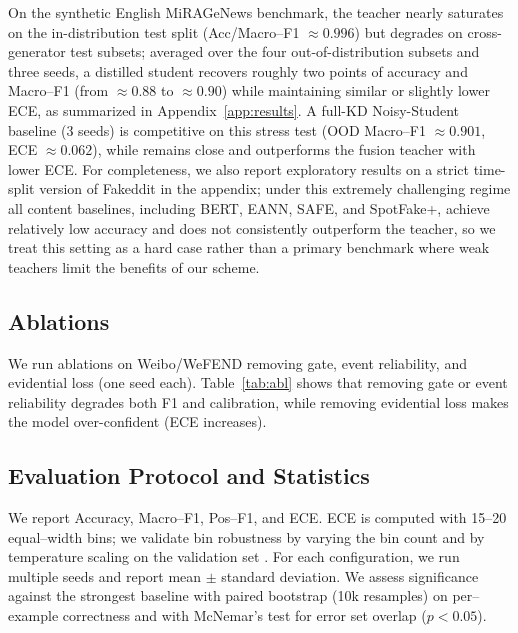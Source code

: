 On the synthetic English MiRAGeNews benchmark, the teacher nearly saturates on the in-distribution test split (Acc/Macro--F1 $\approx 0.996$) but degrades on cross-generator test subsets; averaged over the four out-of-distribution subsets and three seeds, a distilled student recovers roughly two points of accuracy and Macro--F1 (from $\approx 0.88$ to $\approx 0.90$) while maintaining similar or slightly lower ECE, as summarized in Appendix~\ref{app:results}. A full-KD Noisy-Student baseline (3 seeds) is competitive on this stress test (OOD Macro--F1 $\approx 0.901$, ECE $\approx 0.062$), while \modelname{} remains close and outperforms the fusion teacher with lower ECE. For completeness, we also report exploratory results on a strict time-split version of Fakeddit in the appendix; under this extremely challenging regime all content baselines, including BERT, EANN, SAFE, and SpotFake+, achieve relatively low accuracy and \modelname{} does not consistently outperform the teacher, so we treat this setting as a hard case rather than a primary benchmark where weak teachers limit the benefits of our scheme.

\subsection{Ablations}
We run ablations on Weibo/WeFEND removing gate, event reliability, and evidential loss (one seed each). Table~\ref{tab:abl} shows that removing gate or event reliability degrades both F1 and calibration, while removing evidential loss makes the model over-confident (ECE increases).


\subsection{Evaluation Protocol and Statistics}
We report Accuracy, Macro–F1, Pos–F1, and ECE. ECE is computed with 15–20 equal–width bins; we validate bin robustness by varying the bin count and by temperature scaling on the validation set \citep{Guo2017Calibration}. For each configuration, we run multiple seeds and report mean \(\pm\) standard deviation. We assess significance against the strongest baseline with paired bootstrap (10k resamples) on per–example correctness and with McNemar’s test for error set overlap (\(p<0.05\)).

